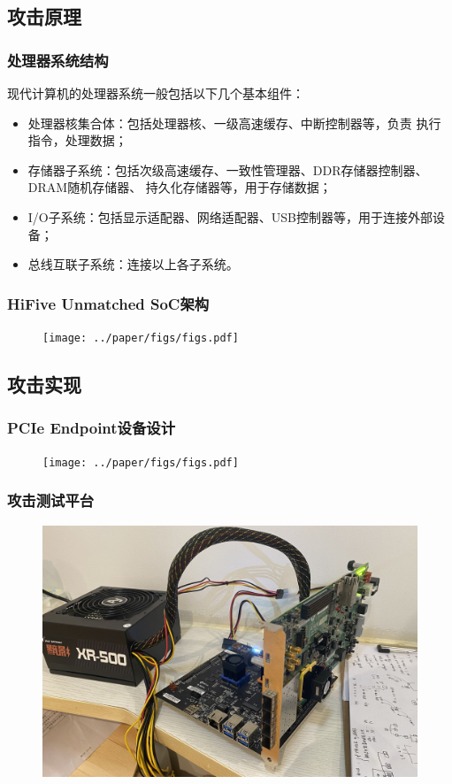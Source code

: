 \documentclass[presentation,aspectratio=169]{beamer}
\begin{document}
\subsection{攻击原理}
\begin{frame}
\frametitle{处理器系统结构}
现代计算机的处理器系统一般包括以下几个基本组件：
\begin{itemize}
    \item 处理器核集合体：包括处理器核、一级高速缓存、中断控制器等，负责
    执行指令，处理数据；
    \item 存储器子系统：包括次级高速缓存、一致性管理器、DDR存储器控制器、DRAM随机存储器、
    持久化存储器等，用于存储数据；
    \item I/O子系统：包括显示适配器、网络适配器、USB控制器等，用于连接外部设备；
    \item 总线互联子系统：连接以上各子系统。
\end{itemize}
\end{frame}

\begin{frame}
\frametitle{HiFive Unmatched SoC架构}
\begin{figure}[ht]
    \centering
    \texttt{[image: ../paper/figs/figs.pdf]}
\end{figure}
\end{frame}

\subsection{攻击实现}
\begin{frame}
    \frametitle{PCIe Endpoint设备设计}
    \begin{figure}[ht]
        \centering
        \texttt{[image: ../paper/figs/figs.pdf]}
    \end{figure}
\end{frame}

\begin{frame}
    \frametitle{攻击测试平台}
    \begin{figure}[ht]
        \centering
        \includegraphics[scale=0.075]{./figs/pcie-tb.jpg}
    \end{figure}
\end{frame}
\end{document}
